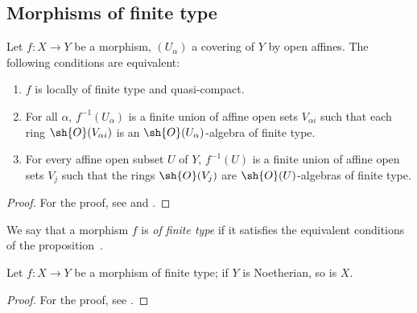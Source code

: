 \subsection{Morphisms of finite type}
\label{subsection:IV.1.5}

\begin{proposition}[1.5.1]
\label{IV.1.5.1}
Let $f:X\to Y$ be a morphism, $(U_\alpha)$ a covering of $Y$ by open affines.
The following conditions are equivalent:
\begin{enumerate}
  \item[\rm a)] $f$ is locally of finite type and quasi-compact.
  \item[\rm b)] For all $\alpha$, $f^{-1}(U_\alpha)$ is a finite union of affine open sets $V_{\alpha i}$ such that each ring $\sh{O}(V_{\alpha i})$ is an $\sh{O}(U_\alpha)$-algebra of finite type.
  \item[\rm c)] For every affine open subset $U$ of $Y$, $f^{-1}(U)$ is a finite union of affine open sets $V_j$ such that the rings $\sh{O}(V_j)$ are $\sh{O}(U)$-algebras of finite type.
\end{enumerate}
\end{proposition}

\begin{proof}
For the proof, see  and .
\end{proof}

\begin{definition}[1.5.2]
\label{IV.1.5.2}
We say that a morphism $f$ is \emph{of finite type} if it satisfies the equivalent conditions of the proposition~.
\end{definition}

\begin{proposition}[1.5.3]
\label{IV.1.5.3}
Let $f:X\to Y$ be a morphism of finite type; if $Y$ is Noetherian, so is $X$.
\end{proposition}

\begin{proof}
For the proof, see .
\end{proof}

